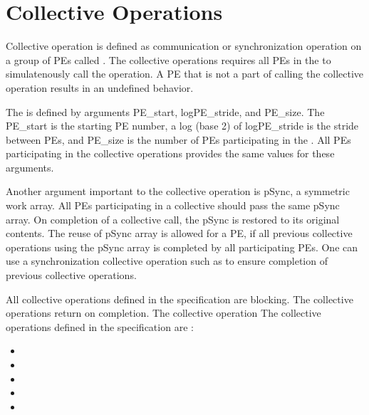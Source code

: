 \section{Collective Operations}
Collective operation is defined as communication or synchronization operation 
on a group of \ac{PE}s called \activeset{}. The collective operations requires all
\ac{PE}s in the \activeset{} to simulatenously call the operation. 
A \ac{PE} that is not a part of \activeset{} calling the collective 
operation results in an undefined behavior.

The \activeset{} is defined by arguments PE\_start, logPE\_stride, 
and PE\_size. The PE\_start is the starting \ac{PE} number, a log (base 2) of logPE\_stride 
is the stride between \ac{PE}s, and PE\_size is the number of \ac{PE}s 
participating in the \activeset{}. All \ac{PE}s participating in the 
collective operations provides the same values for these arguments. 
 
Another argument important to the collective operation is pSync, a symmetric work 
array. All \ac{PE}s participating in a collective should pass the same
pSync array. On completion of a collective call, the pSync is restored to its 
original contents. The reuse of pSync array is allowed for a \ac{PE}, if all previous collective 
operations using the pSync array is completed by all participating 
\ac{PE}s. One can use a synchronization collective operation such as \barrier{}
to ensure completion of previous collective operations.

All collective operations defined in the specification are blocking. The 
collective operations return on completion. The collective operation 
The collective operations defined in the \openshmem{} specification 
are :

\begin{itemize}
\item[] \broadcast{} 
\item[] \barrier{}
\item[] \barrierall{}
\item[] \collect{}
\item[] \reduction{} 
\end{itemize} 


